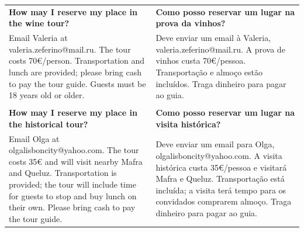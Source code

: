 \documentclass[6pt]{article}
\begin{document}
\pagestyle{empty}

\small
\begin{tabular}{p{2in}|p{2in}}
{\bf How may I reserve my place in the wine tour?} & {\bf Como posso reservar um lugar na prova da vinhos?}\\
Email Valeria at valeria.zeferino@mail.ru. The tour costs 70\euro{}/person. Transportation and lunch are provided; please bring cash to pay the tour guide. Guests must be 18 years old or older. 
&
Deve enviar um email à Valeria, valeria.zeferino@mail.ru. A prova de vinhos custa 70\euro{}/pessoa. Transportação e almoço estão incluídos. Traga dinheiro para pagar ao guia.\\
&\\
{\bf How may I reserve my place in the historical tour?} 
&
{\bf Como posso reservar um lugar na visita histórica?}\\
Email Olga at olgalisboncity@yahoo.com. The tour costs 35\euro{} and will visit nearby Mafra and Queluz. Transportation is provided; the tour will include time for guests to stop and buy lunch on their own. Please bring cash to pay the tour guide.
&
Deve enviar um email para Olga, olgalisboncity@yahoo.com. A visita histórica custa 35\euro{}/pessoa e visitará Mafra e Queluz. Transportação está incluída; a visita terá tempo para os convidados comprarem almoço. Traga dinheiro para pagar ao guia.\\

\end{tabular}
\end{document}
